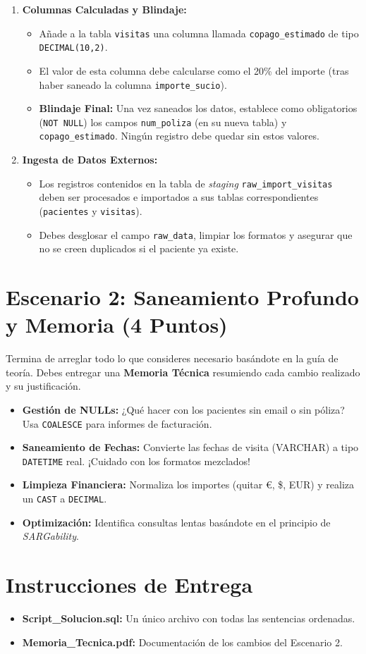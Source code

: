 \documentclass[12pt,a4paper]{article}
\begin{document}
\begin{enumerate}
    \item \textbf{Columnas Calculadas y Blindaje:}
    \begin{itemize}
        \item Añade a la tabla \texttt{visitas} una columna llamada \texttt{copago\_estimado} de tipo \texttt{DECIMAL(10,2)}.
        \item El valor de esta columna debe calcularse como el 20\% del importe (tras haber saneado la columna \texttt{importe\_sucio}).
        \item \textbf{Blindaje Final:} Una vez saneados los datos, establece como obligatorios (\texttt{NOT NULL}) los campos \texttt{num\_poliza} (en su nueva tabla) y \texttt{copago\_estimado}. Ningún registro debe quedar sin estos valores.
    \end{itemize}

    \item \textbf{Ingesta de Datos Externos:}
    \begin{itemize}
        \item Los registros contenidos en la tabla de \textit{staging} \texttt{raw\_import\_visitas} deben ser procesados e importados a sus tablas correspondientes (\texttt{pacientes} y \texttt{visitas}).
        \item Debes desglosar el campo \texttt{raw\_data}, limpiar los formatos y asegurar que no se creen duplicados si el paciente ya existe.
    \end{itemize}
\end{enumerate}

\section{Escenario 2: Saneamiento Profundo y Memoria (4 Puntos)}
Termina de arreglar todo lo que consideres necesario basándote en la guía de teoría. Debes entregar una \textbf{Memoria Técnica} resumiendo cada cambio realizado y su justificación.

\begin{tcolorbox}[title=Retos sugeridos para el Escenario 2]
\begin{itemize}
    \item \textbf{Gestión de NULLs:} ¿Qué hacer con los pacientes sin email o sin póliza? Usa \texttt{COALESCE} para informes de facturación.
    \item \textbf{Saneamiento de Fechas:} Convierte las fechas de visita (VARCHAR) a tipo \texttt{DATETIME} real. ¡Cuidado con los formatos mezclados!
    \item \textbf{Limpieza Financiera:} Normaliza los importes (quitar €, \$, EUR) y realiza un \texttt{CAST} a \texttt{DECIMAL}.
    \item \textbf{Optimización:} Identifica consultas lentas basándote en el principio de \textit{SARGability}.
\end{itemize}
\end{tcolorbox}

\section*{Instrucciones de Entrega}
\begin{itemize}
    \item \textbf{Script\_Solucion.sql:} Un único archivo con todas las sentencias ordenadas.
    \item \textbf{Memoria\_Tecnica.pdf:} Documentación de los cambios del Escenario 2.
\end{itemize}
\end{document}
